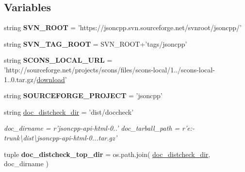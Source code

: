 \subsection*{Variables}
\begin{DoxyCompactItemize}
\item 
\hypertarget{namespacemakerelease_aba7ee6a7e7fd7636993ae2c0fa9a5a8a}{string {\bfseries S\+V\+N\+\_\+\+R\+O\+O\+T} = 'https\+://jsoncpp.\+svn.\+sourceforge.\+net/svnroot/jsoncpp/'}\label{namespacemakerelease_aba7ee6a7e7fd7636993ae2c0fa9a5a8a}

\item 
\hypertarget{namespacemakerelease_af1c37541c9d94e3b69ab02abb55ecb77}{string {\bfseries S\+V\+N\+\_\+\+T\+A\+G\+\_\+\+R\+O\+O\+T} = S\+V\+N\+\_\+\+R\+O\+O\+T+'tags/jsoncpp'}\label{namespacemakerelease_af1c37541c9d94e3b69ab02abb55ecb77}

\item 
\hypertarget{namespacemakerelease_a88eec132edf1aae4b926ee2151937eea}{string {\bfseries S\+C\+O\+N\+S\+\_\+\+L\+O\+C\+A\+L\+\_\+\+U\+R\+L} = 'http\+://sourceforge.\+net/projects/scons/files/scons-\/local/1../scons-\/local-\/1..\+0.tar.\+gz/\hyperlink{namespacemakerelease_a73900f16465b5a348bb5dce4c6300e2f}{download}'}\label{namespacemakerelease_a88eec132edf1aae4b926ee2151937eea}

\item 
\hypertarget{namespacemakerelease_a025bc25676bcb01df36ac69edb6bd1c0}{string {\bfseries S\+O\+U\+R\+C\+E\+F\+O\+R\+G\+E\+\_\+\+P\+R\+O\+J\+E\+C\+T} = 'jsoncpp'}\label{namespacemakerelease_a025bc25676bcb01df36ac69edb6bd1c0}

\item 
\hypertarget{namespacemakerelease_a01c9c52f2fa44eff7202792dc6dffbd8}{string \hyperlink{namespacemakerelease_a01c9c52f2fa44eff7202792dc6dffbd8}{doc\+\_\+distcheck\+\_\+dir} = 'dist/doccheck'}\label{namespacemakerelease_a01c9c52f2fa44eff7202792dc6dffbd8}

\begin{DoxyCompactList}\small\item\em doc\+\_\+dirname = r'jsoncpp-\/api-\/html-\/0..' doc\+\_\+tarball\+\_\+path = r'e\+:-\/trunk\textbackslash{}dist\textbackslash{}jsoncpp-\/api-\/html-\/0...\+tar.\+gz' \end{DoxyCompactList}\item 
\hypertarget{namespacemakerelease_a64b35c456c3e19538ce9b7088b402d3c}{tuple {\bfseries doc\+\_\+distcheck\+\_\+top\+\_\+dir} = os.\+path.\+join( \hyperlink{namespacemakerelease_a01c9c52f2fa44eff7202792dc6dffbd8}{doc\+\_\+distcheck\+\_\+dir}, doc\+\_\+dirname )}\label{namespacemakerelease_a64b35c456c3e19538ce9b7088b402d3c}


\end{DoxyCompactItemize}
